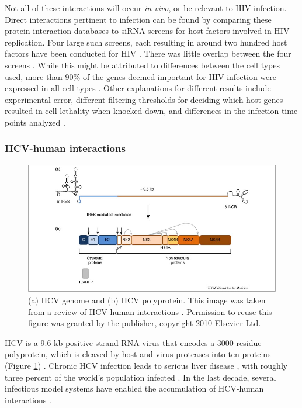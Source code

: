 Not all of these interactions will occur \textit{in-vivo}, or be relevant to
HIV infection. Direct interactions pertinent to infection can be found
by comparing these protein interaction databases to siRNA screens for
host factors involved in HIV replication. Four large such screens,
each resulting in around two hundred host factors have been conducted
for HIV \cite{zhou08, konig08, brass08, yeung09}. There was little
overlap between the four screens \cite{yeung09, bushman09}. While this
might be attributed to differences between the cell types used, more
than 90\% of the genes deemed important for HIV infection were
expressed in all cell types \cite{bushman09}. Other explanations for
different results include experimental error, different filtering
thresholds for deciding which host genes resulted in cell lethality
when knocked down, and differences in the infection time points
analyzed \cite{bushman09}.


\subsubsection{HCV-human interactions}

\begin{figure}
\begin{center}
\includegraphics[scale=0.75]{figs/hcv_proteins}
\end{center}
\caption[HCV genome]{\small (a) HCV genome and (b) HCV
  polyprotein. This image was taken from a review of HCV-human
  interactions \cite{georgel2010virus}. Permission to reuse this
  figure was granted by the publisher, copyright 2010 Elsevier
  Ltd. \label{fig:hcv_proteins}}
\end{figure}

HCV is a 9.6 kb positive-strand RNA virus that encodes a 3000 residue
polyprotein, which is cleaved by host and virus proteases into ten
proteins (Figure \ref{fig:hcv_proteins})
\cite{moradpour2007replication}. Chronic HCV infection leads to
serious liver disease \cite{georgel2010virus}, with roughly three
percent of the world's population infected
\cite{shepard2005global}. In the last decade, several infectious model
systems have enabled the accumulation of HCV-human interactions
\cite{georgel2010virus}.

